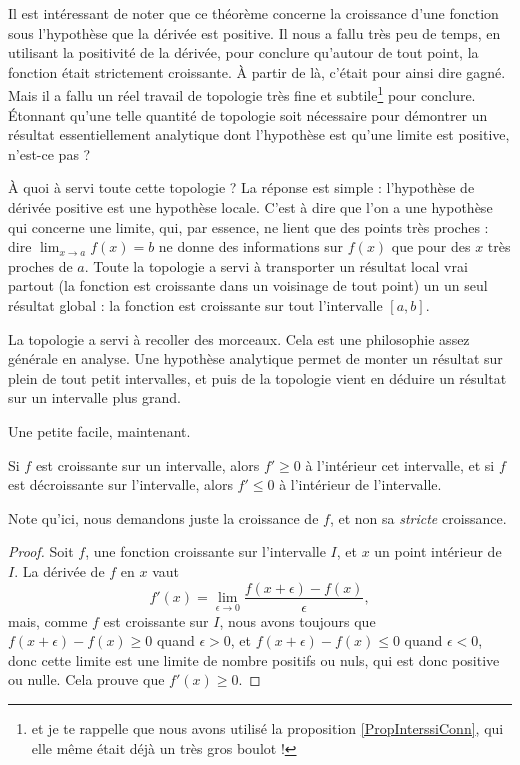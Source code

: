 \documentclass{article}
\begin{document}
Il est intéressant de noter que ce théorème concerne la croissance d'une fonction sous l'hypothèse que la dérivée est positive. Il nous a fallu très peu de temps, en utilisant la positivité de la dérivée, pour conclure qu'autour de tout point, la fonction était strictement croissante. À partir de là, c'était pour ainsi dire gagné. Mais il a fallu un réel travail de topologie très fine et subtile\footnote{et je te rappelle que nous avons utilisé la proposition \ref{PropInterssiConn}, qui elle même était déjà un très gros boulot !} pour conclure. Étonnant qu'une telle quantité de topologie soit nécessaire pour démontrer un résultat essentiellement analytique dont l'hypothèse est qu'une limite est positive, n'est-ce pas ? 

À quoi à servi toute cette topologie ? La réponse est simple : l'hypothèse de dérivée positive est une hypothèse locale. C'est à dire que l'on a une hypothèse qui concerne une limite, qui, par essence, ne lient que des points très proches : dire \og $\lim_{x\to a}f(x)=b$\fg{}  ne donne des informations sur $f(x)$ que pour des $x$ très proches de $a$. Toute la topologie a servi à transporter un résultat local vrai partout (la fonction est croissante dans un voisinage de tout point) un un seul résultat global : la fonction est croissante sur tout l'intervalle $[a,b]$.

La topologie a servi à recoller des morceaux. Cela est une philosophie assez générale en analyse. Une hypothèse analytique permet de monter un résultat sur plein de tout petit intervalles, et puis de la topologie vient en déduire un résultat sur un intervalle plus grand.

Une petite facile, maintenant.

\begin{proposition}
	Si $f$ est croissante sur un intervalle, alors $f'\geq 0$ à l'intérieur cet intervalle, et si $f$ est décroissante sur l'intervalle, alors $f'\leq 0$ à l'intérieur de l'intervalle.
\end{proposition}

Note qu'ici, nous demandons juste la croissance de $f$, et non sa \emph{stricte} croissance.

\begin{proof}
	Soit $f$, une fonction croissante sur l'intervalle $I$, et $x$ un point intérieur de $I$. La dérivée de $f$ en $x$ vaut
	\begin{equation}
		f'(x)=\lim_{\epsilon\to 0}\frac{ f(x+\epsilon)-f(x) }{\epsilon},
	\end{equation}
	mais, comme $f$ est croissante sur $I$, nous avons toujours que $f(x+\epsilon)-f(x)\geq0$ quand $\epsilon>0$, et $f(x+\epsilon)-f(x)\leq0$ quand $\epsilon<0$, donc cette limite est une limite de nombre positifs ou nuls, qui est donc positive ou nulle. Cela prouve que $f'(x)\geq 0$.
\end{proof}
\end{document}
